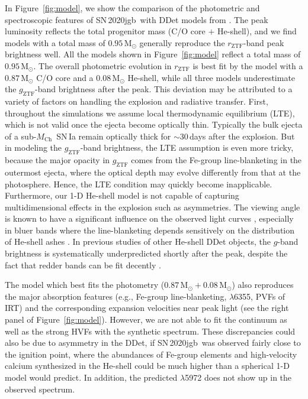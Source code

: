 \documentclass[twocolumn]{aastex631}
\newcommand{\sn}{SN\,2020jgb}
\newcommand{\Mch}{$M_\mathrm{Ch}$}
\begin{document}
In Figure~\ref{fig:model}, we show the comparison of the photometric and spectroscopic features of \sn\ with DDet models from \citet{polin_observational_2019}. The peak luminosity reflects the total progenitor mass (C/O core $+$ He-shell), and we find models with a total mass of $0.95\,\mathrm{M_\odot}$ generally reproduce the $r_\mathrm{ZTF}$-band peak brightness well. All the models shown in Figure~\ref{fig:model} reflect a total mass of $0.95\,\mathrm{M_\odot}$. The overall photometric evolution in $r_\mathrm{ZTF}$ is best fit by the model with a $0.87\,\mathrm{M_\odot}$ C/O core and a $0.08\,\mathrm{M_\odot}$ He-shell, while all three models underestimate the $g_\mathrm{ZTF}$-band brightness after the peak. This deviation may be attributed to a variety of factors on handling the explosion and radiative transfer. First, throughout the simulations we assume local thermodynamic equilibrium (LTE), which is not valid once the ejecta become optically thin. Typically the bulk ejecta of a sub-\Mch\ SN\,Ia remain optically thick for $\sim$30\,days after the explosion. But in modeling the $g_\mathrm{ZTF}$-band brightness, the LTE assumption is even more tricky, because the major opacity in $g_\mathrm{ZTF}$ comes from the Fe-group line-blanketing in the outermost ejecta, where the optical depth may evolve differently from that at the photosphere. Hence, the LTE condition may quickly become inapplicable. Furthermore, our 1-D He-shell model is not capable of capturing multidimensional effects in the explosion such as asymmetries. The viewing angle is known to have a significant influence on the observed light curves \citep{Kromer_DD_2010, Sim_2012, Gronow_2020, Shen_2D_2021}, especially in bluer bands where the line-blanketing depends sensitively on the distribution of He-shell ashes \citep{Shen_2D_2021}. In previous studies of other He-shell DDet objects, the $g$-band brightness is systematically underpredicted shortly after the peak, despite the fact that redder bands can be fit decently \citep[e.g.,][]{jiang_16jhr_2017,jacobson-galan_16hnk_2020}.

The model which best fits the photometry ($0.87\,\mathrm{M_\odot}+0.08\,\mathrm{M_\odot}$) also reproduces the major absorption features (e.g., Fe-group line-blanketing,  $\lambda$6355, PVFs of  IRT) and the corresponding expansion velocities near peak light (see the right panel of Figure~\ref{fig:model}). However, we are not able to fit the continuum as well as the strong  HVFs with the synthetic spectrum. These discrepancies could also be due to asymmetry in the DDet, if \sn\ was observed fairly close to the ignition point, where the abundances of Fe-group elements and high-velocity calcium synthesized in the He-shell could be much higher than a spherical 1-D model would predict.
In addition, the predicted  $\lambda$5972 does not show up in the observed spectrum.
\end{document}
